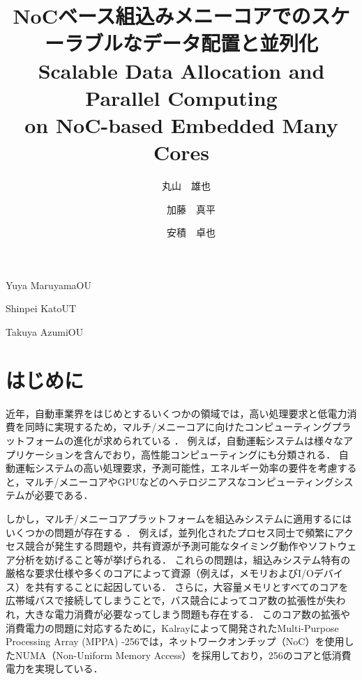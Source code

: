 \documentclass[submit,techrep]{ipsj_v2/UTF8/ipsj}
\begin{document}
\title{
    {\Huge NoCベース組込みメニーコアでのスケーラブルなデータ配置と並列化}
  \\{\huge Scalable Data Allocation and Parallel Computing \\ on NoC-based Embedded Many Cores}
}

\etitle{\vspace{-3.5cm}}



\author{　{\LARGE 丸山　雄也}}{{\Large Yuya Maruyama}}{OU}%
\author{　　{\LARGE 加藤　真平}}{{\Large Shinpei Kato}}{UT}%
\author{　　{\LARGE 安積　卓也}}{{\Large Takuya Azumi}}{OU}%

\maketitle

\pagestyle{empty} \thispagestyle{fancy}

\section{はじめに}
近年，自動車業界をはじめとするいくつかの領域では，高い処理要求と低電力消費を同時に実現するため，マルチ/メニーコアに向けたコンピューティングプラットフォームの進化が求められている \cite{becker2016contention} \cite{faragardi2014communication} \cite{perret2016mapping}．
例えば，自動運転システムは様々なアプリケーションを含んでおり，高性能コンピューティングにも分類される．
自動運転システムの高い処理要求，予測可能性，エネルギー効率の要件を考慮すると，マルチ/メニーコアやGPUなどのヘテロジニアスなコンピューティングシステムが必要である．

しかし，マルチ/メニーコアプラットフォームを組込みシステムに適用するにはいくつかの問題が存在する \cite{becker2016contention} \cite{saidi2015shift}．
例えば，並列化されたプロセス同士で頻繁にアクセス競合が発生する問題や，共有資源が予測可能なタイミング動作やソフトウェア分析を妨げること等が挙げられる．
これらの問題は，組込みシステム特有の厳格な要求仕様や多くのコアによって資源（例えば，メモリおよびI/Oデバイス）を共有することに起因している．
さらに，大容量メモリとすべてのコアを広帯域バスで接続してしまうことで，バス競合によってコア数の拡張性が失われ，大きな電力消費が必要なってしまう問題も存在する．
このコア数の拡張や消費電力の問題に対応するために，Kalrayによって開発されたMulti-Purpose Processing Array (MPPA) -256では，ネットワークオンチップ（NoC）を使用したNUMA（Non-Uniform Memory Access）を採用しており，256のコアと低消費電力を実現している．
\end{document}
